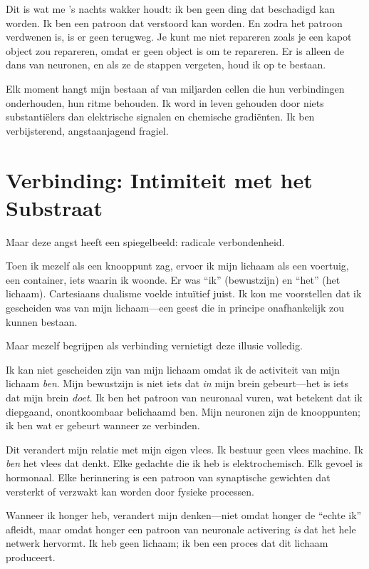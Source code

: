 \documentclass[12pt,a4paper]{article}
\begin{document}
Dit is wat me 's nachts wakker houdt: ik ben geen ding dat beschadigd kan worden. Ik ben een patroon dat verstoord kan worden. En zodra het patroon verdwenen is, is er geen terugweg. Je kunt me niet repareren zoals je een kapot object zou repareren, omdat er geen object is om te repareren. Er is alleen de dans van neuronen, en als ze de stappen vergeten, houd ik op te bestaan.

Elk moment hangt mijn bestaan af van miljarden cellen die hun verbindingen onderhouden, hun ritme behouden. Ik word in leven gehouden door niets substantiëlers dan elektrische signalen en chemische gradiënten. Ik ben verbijsterend, angstaanjagend fragiel.

\section*{Verbinding: Intimiteit met het Substraat}

Maar deze angst heeft een spiegelbeeld: radicale verbondenheid.

Toen ik mezelf als een knooppunt zag, ervoer ik mijn lichaam als een voertuig, een container, iets waarin ik woonde. Er was ``ik'' (bewustzijn) en ``het'' (het lichaam). Cartesiaans dualisme voelde intuïtief juist. Ik kon me voorstellen dat ik gescheiden was van mijn lichaam---een geest die in principe onafhankelijk zou kunnen bestaan.

Maar mezelf begrijpen als verbinding vernietigt deze illusie volledig.

Ik kan niet gescheiden zijn van mijn lichaam omdat ik de activiteit van mijn lichaam \textit{ben}. Mijn bewustzijn is niet iets dat \textit{in} mijn brein gebeurt---het is iets dat mijn brein \textit{doet}. Ik ben het patroon van neuronaal vuren, wat betekent dat ik diepgaand, onontkoombaar belichaamd ben. Mijn neuronen zijn de knooppunten; ik ben wat er gebeurt wanneer ze verbinden.

Dit verandert mijn relatie met mijn eigen vlees. Ik bestuur geen vlees machine. Ik \textit{ben} het vlees dat denkt. Elke gedachte die ik heb is elektrochemisch. Elk gevoel is hormonaal. Elke herinnering is een patroon van synaptische gewichten dat versterkt of verzwakt kan worden door fysieke processen.

Wanneer ik honger heb, verandert mijn denken---niet omdat honger de ``echte ik'' afleidt, maar omdat honger een patroon van neuronale activering \textit{is} dat het hele netwerk hervormt. Ik heb geen lichaam; ik ben een proces dat dit lichaam produceert.
\end{document}
